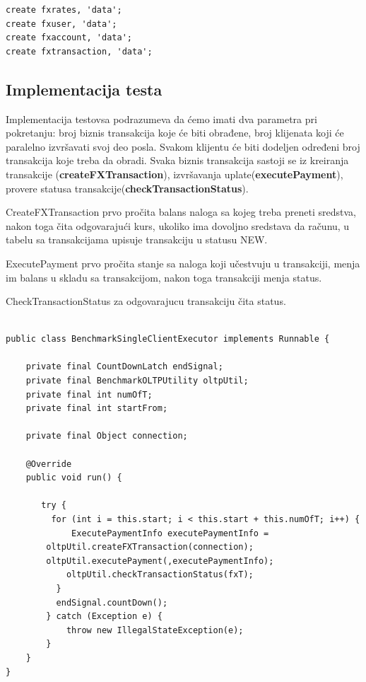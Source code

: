 \documentclass[12pt,oneside]{memoir}
\begin{document}
\begin{lstlisting}[title={setup-hbase-model.sh},captionpos=t]
create fxrates, 'data';
create fxuser, 'data';
create fxaccount, 'data';
create fxtransaction, 'data';
\end{lstlisting}

\subsection{Implementacija testa}

Implementacija testovsa podrazumeva da ćemo imati dva parametra pri pokretanju: broj biznis transakcija koje će biti obrađene, broj klijenata koji će paralelno izvršavati svoj deo posla. Svakom klijentu će biti dodeljen određeni broj transakcija koje treba da obradi. Svaka biznis transakcija sastoji se iz kreiranja transakcije (\textbf{createFXTransaction}), izvršavanja uplate(\textbf{executePayment}), provere statusa transakcije(\textbf{checkTransactionStatus}). 

CreateFXTransaction prvo pročita balans naloga sa kojeg treba preneti sredstva, nakon toga čita odgovarajući kurs, ukoliko ima dovoljno sredstava da računu, u tabelu sa transakcijama upisuje transakciju u statusu NEW.

ExecutePayment prvo pročita stanje sa naloga koji učestvuju u transakciji, menja im balans u skladu sa transakcijom, nakon toga transakciji menja status.

CheckTransactionStatus za odgovarajucu transakciju čita status.



\begin{lstlisting}[title={BenchmarkSingleClientExecutor.java},captionpos=t]

public class BenchmarkSingleClientExecutor implements Runnable {

    private final CountDownLatch endSignal;
    private final BenchmarkOLTPUtility oltpUtil;
    private final int numOfT;
    private final int startFrom;

    private final Object connection;

    @Override
    public void run() {

       try {
         for (int i = this.start; i < this.start + this.numOfT; i++) {
             ExecutePaymentInfo executePaymentInfo = 
	    oltpUtil.createFXTransaction(connection);
	    oltpUtil.executePayment(,executePaymentInfo);
            oltpUtil.checkTransactionStatus(fxT);
          }
          endSignal.countDown();
        } catch (Exception e) {
            throw new IllegalStateException(e);
        }
    }
}

\end{lstlisting}
\end{document}
